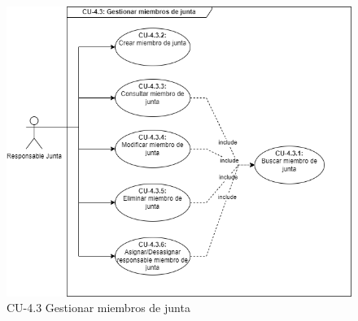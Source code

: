 \begin{figure}[H]
        \centering
        \includegraphics[scale=0.55]{img/diagramas/Funcional/CU-4.3.png}
        \caption{CU-4.3 Gestionar miembros de junta}
        \label{fig:Diagrama-Caso de uso 4.3 Gestionar miembros de junta}
    \end{figure}

